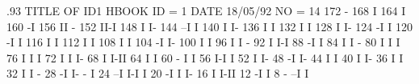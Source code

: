 \begin{Listing}\baselineskip.93\baselineskip\relax
 TITLE OF ID1                                                                    
 HBOOK     ID =         1                                        DATE  18/05/92              NO =    14
      172                                    -
      168                                    I
      164                                    I
      160                                   -I
      156                                   II -
      152                                   II-I
      148                                   I  I-
      144                                 --I   I
      140                                 I     I-
      136                                 I      I
      132                                 I      I
      128                                 I      I-
      124                                -I       I
      120                               -I        I
      116                               I         I
      112                               I         I
      108                               I         I
      104                              -I         I-
      100                              I           I
       96                              I           I -
       92                              I           I-I
       88                             -I             I
       84                             I              I -
       80                             I              I I
       76                             I              I I
       72                             I              I I-
       68                             I              I-II
       64                             I                 I
       60                           - I                 I
       56                           I-I                 I
       52                           I                   I-
       48                          -I                    I-
       44                          I                      I
       40                          I                      I-
       36                          I                       I
       32                          I                       I    -
       28                         -I                       I- - I
       24                       --I                         I-I I
       20                      -I                             I I-
       16                      I                              I-II
       12                     -I                                 I
        8                 - --I                                  I

\end{Listing}
